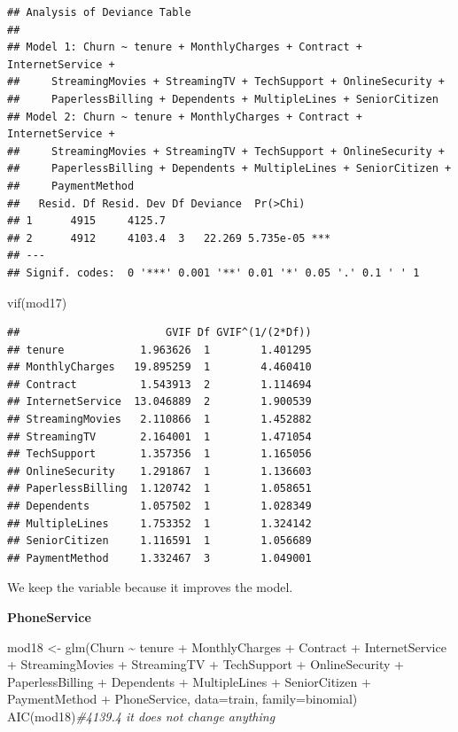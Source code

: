 \documentclass[
  twoside]{article}
\newenvironment{Shaded}{\begin{snugshade}}{\end{snugshade}}
\newcommand{\AttributeTok}[1]{\textcolor[rgb]{0.77,0.63,0.00}{#1}}
\newcommand{\CommentTok}[1]{\textcolor[rgb]{0.56,0.35,0.01}{\textit{#1}}}
\newcommand{\FunctionTok}[1]{\textcolor[rgb]{0.00,0.00,0.00}{#1}}
\newcommand{\NormalTok}[1]{#1}
\newcommand{\OtherTok}[1]{\textcolor[rgb]{0.56,0.35,0.01}{#1}}
\newcommand{\SpecialCharTok}[1]{\textcolor[rgb]{0.00,0.00,0.00}{#1}}
\begin{document}
\begin{verbatim}
## Analysis of Deviance Table
## 
## Model 1: Churn ~ tenure + MonthlyCharges + Contract + InternetService + 
##     StreamingMovies + StreamingTV + TechSupport + OnlineSecurity + 
##     PaperlessBilling + Dependents + MultipleLines + SeniorCitizen
## Model 2: Churn ~ tenure + MonthlyCharges + Contract + InternetService + 
##     StreamingMovies + StreamingTV + TechSupport + OnlineSecurity + 
##     PaperlessBilling + Dependents + MultipleLines + SeniorCitizen + 
##     PaymentMethod
##   Resid. Df Resid. Dev Df Deviance  Pr(>Chi)    
## 1      4915     4125.7                          
## 2      4912     4103.4  3   22.269 5.735e-05 ***
## ---
## Signif. codes:  0 '***' 0.001 '**' 0.01 '*' 0.05 '.' 0.1 ' ' 1
\end{verbatim}

\begin{Shaded}
\begin{Highlighting}[]
\FunctionTok{vif}\NormalTok{(mod17)}
\end{Highlighting}
\end{Shaded}

\begin{verbatim}
##                       GVIF Df GVIF^(1/(2*Df))
## tenure            1.963626  1        1.401295
## MonthlyCharges   19.895259  1        4.460410
## Contract          1.543913  2        1.114694
## InternetService  13.046889  2        1.900539
## StreamingMovies   2.110866  1        1.452882
## StreamingTV       2.164001  1        1.471054
## TechSupport       1.357356  1        1.165056
## OnlineSecurity    1.291867  1        1.136603
## PaperlessBilling  1.120742  1        1.058651
## Dependents        1.057502  1        1.028349
## MultipleLines     1.753352  1        1.324142
## SeniorCitizen     1.116591  1        1.056689
## PaymentMethod     1.332467  3        1.049001
\end{verbatim}

We keep the variable because it improves the model.

\textbf{PhoneService}

\begin{Shaded}
\begin{Highlighting}[]
\NormalTok{mod18 }\OtherTok{\textless{}{-}} \FunctionTok{glm}\NormalTok{(Churn }\SpecialCharTok{\textasciitilde{}}\NormalTok{ tenure }\SpecialCharTok{+}\NormalTok{ MonthlyCharges }\SpecialCharTok{+}\NormalTok{ Contract }\SpecialCharTok{+}\NormalTok{ InternetService }\SpecialCharTok{+} 
\NormalTok{               StreamingMovies }\SpecialCharTok{+}\NormalTok{ StreamingTV }\SpecialCharTok{+}\NormalTok{ TechSupport }\SpecialCharTok{+}\NormalTok{ OnlineSecurity }\SpecialCharTok{+} 
\NormalTok{               PaperlessBilling }\SpecialCharTok{+}\NormalTok{ Dependents }\SpecialCharTok{+}\NormalTok{ MultipleLines }\SpecialCharTok{+}\NormalTok{ SeniorCitizen }\SpecialCharTok{+} 
\NormalTok{               PaymentMethod }\SpecialCharTok{+}\NormalTok{ PhoneService, }\AttributeTok{data=}\NormalTok{train, }\AttributeTok{family=}\NormalTok{binomial)}
\FunctionTok{AIC}\NormalTok{(mod18)}\CommentTok{\#4139.4 it does not change anything}
\end{Highlighting}
\end{Shaded}
\end{document}
